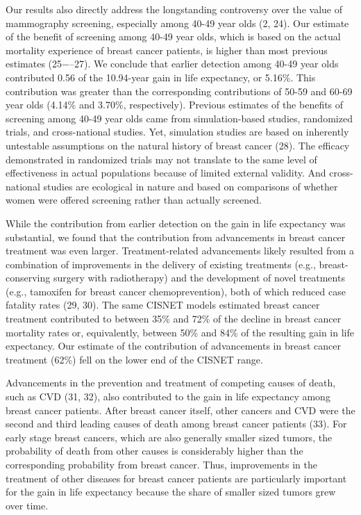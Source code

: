 \documentclass[11pt,letterpaper]{article}
\theoremstyle{plain}
\theoremstyle{remark}
\numberwithin{equation}{section}
\begin{document}
Our results also directly address the longstanding controversy over
the value of mammography screening, especially among 40-49 year olds
(2, 24).  Our estimate of the benefit of screening among 40-49 year
olds, which is based on the actual mortality experience of breast
cancer patients, is higher than most previous estimates (25$-–$27).  We
conclude that earlier detection among 40-49 year olds contributed 0.56
of the 10.94-year gain in life expectancy, or 5.16\%.  This
contribution was greater than the corresponding contributions of 50-59
and 60-69 year olds (4.14\% and 3.70\%, respectively).  Previous
estimates of the benefits of screening among 40-49 year olds came from
simulation-based studies, randomized trials, and cross-national
studies.  Yet, simulation studies are based on inherently untestable
assumptions on the natural history of breast cancer (28).  The
efficacy demonstrated in randomized trials may not translate to the
same level of effectiveness in actual populations because of limited
external validity. And cross-national studies are ecological in nature
and based on comparisons of whether women were offered screening
rather than actually screened.

While the contribution from earlier detection on the gain in life
expectancy was substantial, we found that the contribution from
advancements in breast cancer treatment was even larger.
Treatment-related advancements likely resulted from a combination of
improvements in the delivery of existing treatments (e.g.,
breast-conserving surgery with radiotherapy) and the development of
novel treatments (e.g., tamoxifen for breast cancer chemoprevention),
both of which reduced case fatality rates (29, 30).  The same CISNET
models estimated breast cancer treatment contributed to between 35\%
and 72\% of the decline in breast cancer mortality rates or,
equivalently, between 50\% and 84\% of the resulting gain in life
expectancy.  Our estimate of the contribution of advancements in
breast cancer treatment (62\%) fell on the lower end of the CISNET
range.

Advancements in the prevention and treatment of competing causes of
death, such as CVD (31, 32), also contributed to the gain in life
expectancy among breast cancer patients.  After breast cancer itself,
other cancers and CVD were the second and third leading causes of
death among breast cancer patients (33).  For early stage breast
cancers, which are also generally smaller sized tumors, the
probability of death from other causes is considerably higher than the
corresponding probability from breast cancer.  Thus, improvements in
the treatment of other diseases for breast cancer patients are
particularly important for the gain in life expectancy because the
share of smaller sized tumors grew over time.
\end{document}
